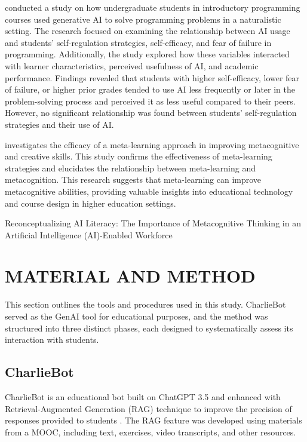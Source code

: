 \documentclass[a4paper,twoside]{article}
\begin{document}
\cite{Margulieux24} conducted a study on how undergraduate students in
introductory programming courses used generative AI to solve programming
problems in a naturalistic setting. The research focused on examining the
relationship between AI usage and students’ self-regulation strategies,
self-efficacy, and fear of failure in programming. Additionally, the study
explored how these variables interacted with learner characteristics, perceived
usefulness of AI, and academic performance. Findings revealed that students
with higher self-efficacy, lower fear of failure, or higher prior grades
tended to use AI less frequently or later in the problem-solving process and
perceived it as less useful compared to their peers. However, no significant
relationship was found between students’ self-regulation strategies and their
use of AI.

\cite{Khusnul24} investigates the efficacy of a meta-learning approach in
improving metacognitive and creative skills. This study confirms the
effectiveness of meta-learning strategies and elucidates the relationship
between meta-learning and metacognition. This research suggests that
meta-learning can improve metacognitive abilities, providing valuable insights
into educational technology and course design in higher education settings.

Reconceptualizing AI Literacy: The Importance of Metacognitive Thinking in an Artificial Intelligence (AI)-Enabled Workforce

\section{\uppercase{Material and Method}}

This section outlines the tools and procedures used in this study. CharlieBot
served as the GenAI tool for educational purposes, and the method was structured
into three distinct phases, each designed to systematically assess its
interaction with students.

\subsection{CharlieBot}

CharlieBot is an educational bot built on ChatGPT 3.5 and enhanced with
Retrieval-Augmented Generation (RAG) technique to improve the precision of
responses provided to students \cite{Sun24}. The RAG feature was developed using
materials from a MOOC, including text, exercises, video transcripts, and other
resources.
\end{document}
